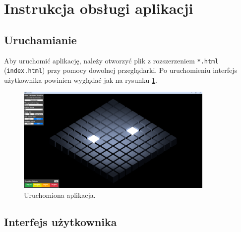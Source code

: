 \documentclass[../doc.tex]{subfiles}
\begin{document}
\section{Instrukcja obsługi aplikacji}

\subsection{Uruchamianie}

Aby uruchomić aplikację, należy otworzyć plik z rozszerzeniem \texttt{*.html} (\texttt{index.html}) przy pomocy dowolnej przeglądarki. Po uruchomieniu interfejs użytkownika powinien wyglądać jak na rysunku \ref{fig:maze_start}.

\begin{figure}[H]
  \centering
  \includegraphics[width=0.85\textwidth]{figures/start.png}
  \caption{Uruchomiona aplikacja.}
  \label{fig:maze_start}
\end{figure}

\subsection{Interfejs użytkownika}
\end{document}

